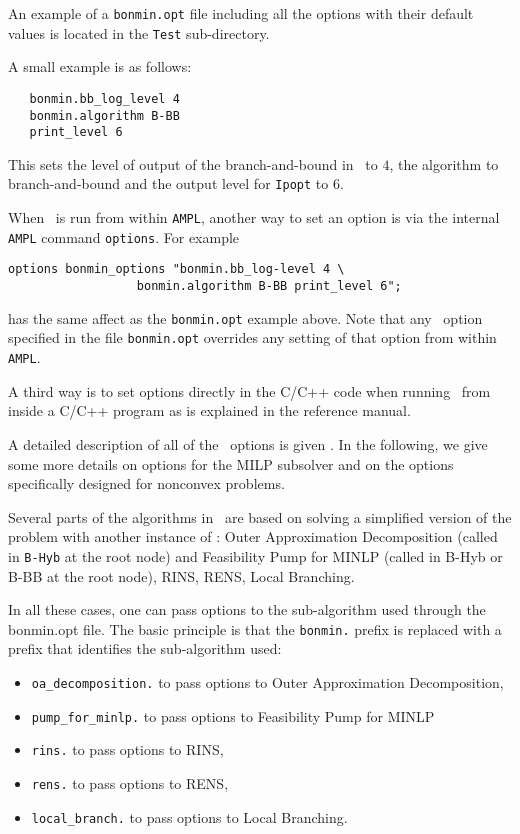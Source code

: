 An example of a {\tt bonmin.opt} file including all the options
with their default values is located in the {\tt Test}
sub-directory.

A small example is as follows:
\begin{verbatim}
   bonmin.bb_log_level 4
   bonmin.algorithm B-BB
   print_level 6
\end{verbatim}
This sets the level of output of the branch-and-bound in \Bonmin\ to $4$, the algorithm to branch-and-bound
and the output level for {\tt Ipopt} to $6$.

When \Bonmin\ is run from within {\tt AMPL}, another way to set
an option is via the
internal {\tt AMPL} command {\tt options}.
For example
\begin{verbatim}
options bonmin_options "bonmin.bb_log-level 4 \
                  bonmin.algorithm B-BB print_level 6";
\end{verbatim}
has the same affect as the {\tt bonmin.opt} example above.
Note that any \Bonmin\ option specified in the file {\tt bonmin.opt}
overrides any setting of that option from within {\tt AMPL}.

A third way is to set options directly in the C/C++ code when
running \Bonmin\ from inside a C/C++ program as is explained in the reference manual.

A detailed description of all of the \Bonmin\ options is given .
In the following, we give some more details on options for the MILP subsolver and
on the options specifically designed
for nonconvex problems.

\latexhtml{

}{
}

Several parts of the algorithms in \Bonmin\ are based on solving a simplified version of the problem with another instance of \Bonmin:
Outer Approximation Decomposition (called in {\tt B-Hyb} at the root node)
and Feasibility Pump for MINLP (called in B-Hyb or B-BB at the root node), RINS, RENS, Local Branching.

In all these cases, one can pass options to the sub-algorithm used through the bonmin.opt file. The basic principle is
that the {\tt bonmin.} prefix  is replaced with a prefix that identifies the sub-algorithm used:
\begin{itemize}
\item {\tt oa\_decomposition.} to pass options to Outer Approximation Decomposition,
\item {\tt pump\_for\_minlp.} to pass options to Feasibility Pump for MINLP
\item {\tt rins.} to pass options to RINS,
\item {\tt rens.} to pass options to RENS,
\item {\tt local\_branch.} to pass options to Local Branching.
\end{itemize}


